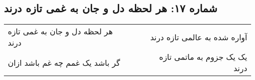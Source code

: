 \begin{center}
\section*{شماره ۱۷: هر لحظه دل و جان به غمی تازه درند}
\label{sec:017}
\begin{longtable}{l p{0.5cm} r}
هر لحظه دل و جان به غمی تازه درند
&&
آواره شده به عالمی تازه درند
\\
گر باشد یک غمم چه غم باشد ازان
&&
یک یک جزوم به ماتمی تازه درند
\\
\end{longtable}
\end{center}
